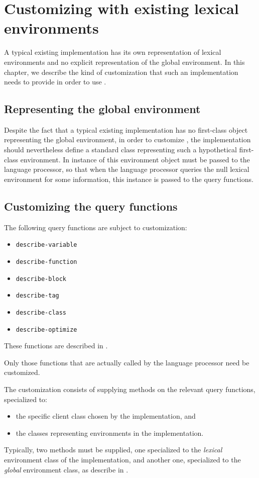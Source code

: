 \chapter{Customizing with existing lexical environments}

A typical existing \commonlisp{} implementation has its own
representation of lexical environments and no explicit representation
of the global environment.  In this chapter, we describe the kind of
customization that such an implementation needs to provide in order to
use \sysname{}.

\section{Representing the global environment}
\label{sec-representing-the-global-environment}

Despite the fact that a typical existing implementation has no
first-class object representing the global environment, in order to
customize \sysname{}, the implementation should nevertheless define a
standard class representing such a hypothetical first-class
environment.  In instance of this environment object must be passed to
the language processor, so that when the language processor queries
the null lexical environment for some information, this instance is
passed to the query functions.

\section{Customizing the query functions}

The following query functions are subject to customization:

\begin{itemize}
\item \texttt{describe-variable}
\item \texttt{describe-function}
\item \texttt{describe-block}
\item \texttt{describe-tag}
\item \texttt{describe-class}
\item \texttt{describe-optimize}
\end{itemize}

These functions are described in .

Only those functions that are actually called by the language
processor need be customized.

The customization consists of supplying methods on the relevant query
functions, specialized to:

\begin{itemize}
\item the specific client class chosen by the implementation, and
\item the classes representing environments in the implementation.
\end{itemize}

Typically, two methods must be supplied, one specialized to the
\emph{lexical} environment class of the implementation, and another
one, specialized to the \emph{global} environment class, as describe
in .
